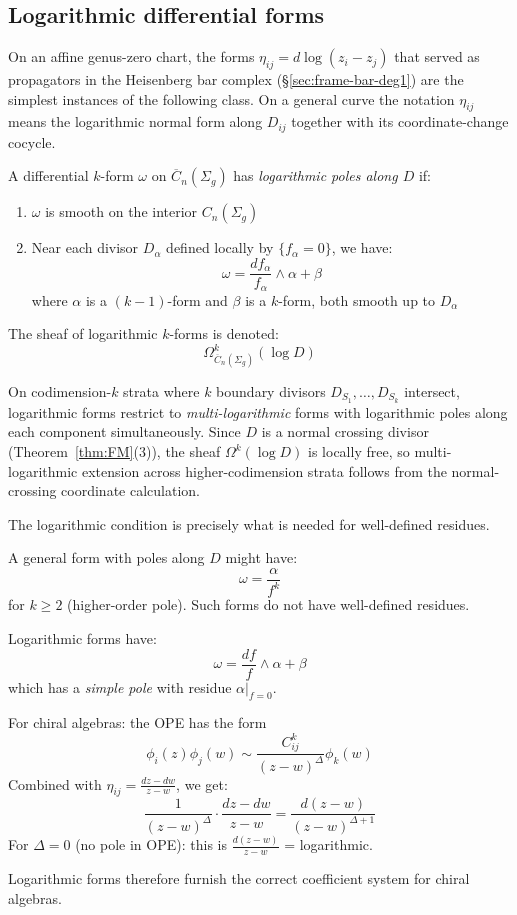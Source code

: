\subsection{Logarithmic differential forms}

\begin{definition}\label{def:log-forms}
On an affine genus-zero chart, the forms
\(\eta_{ij}=d\log(z_i-z_j)\) that served as propagators in the
Heisenberg bar complex (\S\ref{sec:frame-bar-deg1}) are the simplest
instances of the following class. On a general curve the notation
\(\eta_{ij}\) means the logarithmic
normal form along \(D_{ij}\) together with its coordinate-change
cocycle.

A differential $k$-form $\omega$ on $\overline{C}_n(\Sigma_g)$ has \emph{logarithmic poles along $D$} if:
\begin{enumerate}
\item $\omega$ is smooth on the interior $C_n(\Sigma_g)$
\item Near each divisor $D_\alpha$ defined locally by $\{f_\alpha = 0\}$, we have:
\[\omega = \frac{df_\alpha}{f_\alpha} \wedge \alpha + \beta\]
where $\alpha$ is a $(k-1)$-form and $\beta$ is a $k$-form, both smooth up to $D_\alpha$
\end{enumerate}

The sheaf of logarithmic $k$-forms is denoted:
\[\Omega^k_{\overline{C}_n(\Sigma_g)}(\log D)\]
\end{definition}

\begin{remark}\label{rem:multi-log-codim2}
On codimension-$k$ strata where $k$ boundary divisors
$D_{S_1}, \ldots, D_{S_k}$ intersect, logarithmic forms
restrict to \emph{multi-logarithmic} forms with logarithmic
poles along each component simultaneously.
Since $D$ is a normal crossing divisor
(Theorem~\ref{thm:FM}(3)), the sheaf
$\Omega^k(\log D)$ is locally free, so multi-logarithmic
extension across higher-codimension strata follows from the
normal-crossing coordinate calculation.
\end{remark}

\begin{remark}\label{rem:why-log}
The logarithmic condition is precisely what is needed for well-defined residues.

A general form with poles along $D$ might have:
\[\omega = \frac{\alpha}{f^k}\]
for $k \geq 2$ (higher-order pole). Such forms do not have well-defined residues.

Logarithmic forms have:
\[\omega = \frac{df}{f} \wedge \alpha + \beta\]
which has a \emph{simple pole} with residue $\alpha|_{f=0}$.

For chiral algebras: the OPE has the form
\[\phi_i(z)\phi_j(w) \sim \frac{C_{ij}^k}{(z-w)^\Delta} \phi_k(w)\]
Combined with $\eta_{ij} = \frac{dz-dw}{z-w}$, we get:
\[\frac{1}{(z-w)^\Delta} \cdot \frac{dz-dw}{z-w} = \frac{d(z-w)}{(z-w)^{\Delta+1}}\]
For $\Delta = 0$ (no pole in OPE): this is $\frac{d(z-w)}{z-w}$ = logarithmic.

Logarithmic forms therefore furnish the correct coefficient system for chiral algebras.
\end{remark}

